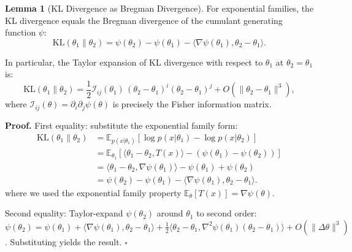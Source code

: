 \documentclass[12pt,a4paper]{article}
\theoremstyle{definition}
\newtheorem{lemma}{Lemma}[section]
\theoremstyle{remark}
\theoremstyle{definition}
\newcommand{\E}{\mathbb{E}}
\newcommand{\Fisher}{\mathcal{I}}
\newcommand{\KL}{\mathrm{KL}}
\begin{document}
\begin{lemma}[KL Divergence as Bregman Divergence]\label{lem:kl_bregman}
For exponential families, the KL divergence equals the Bregman divergence of the cumulant generating function $\psi$:
\[
    \KL(\theta_1 \| \theta_2) = \psi(\theta_2) - \psi(\theta_1) - \langle \nabla \psi(\theta_1), \theta_2 - \theta_1 \rangle.
\]

In particular, the Taylor expansion of KL divergence with respect to $\theta_1$ at $\theta_2 = \theta_1$ is:
\[
    \KL(\theta_1 \| \theta_2) = \frac{1}{2} \Fisher_{ij}(\theta_1) \, (\theta_2 - \theta_1)^i (\theta_2 - \theta_1)^j + O(\|\theta_2 - \theta_1\|^3),
\]
where $\Fisher_{ij}(\theta) = \partial_i \partial_j \psi(\theta)$ is precisely the Fisher information matrix.

\textbf{Proof.}
First equality: substitute the exponential family form:
\begin{align*}
    \KL(\theta_1 \| \theta_2) &= \E_{p(x|\theta_1)}[\log p(x|\theta_1) - \log p(x|\theta_2)] \\
    &= \E_{\theta_1}[\langle \theta_1 - \theta_2, T(x) \rangle - (\psi(\theta_1) - \psi(\theta_2))] \\
    &= \langle \theta_1 - \theta_2, \nabla \psi(\theta_1) \rangle - \psi(\theta_1) + \psi(\theta_2) \\
    &= \psi(\theta_2) - \psi(\theta_1) - \langle \nabla \psi(\theta_1), \theta_2 - \theta_1 \rangle.
\end{align*}
where we used the exponential family property $\E_{\theta}[T(x)] = \nabla \psi(\theta)$.

Second equality: Taylor-expand $\psi(\theta_2)$ around $\theta_1$ to second order:
$\psi(\theta_2) = \psi(\theta_1) + \langle \nabla\psi(\theta_1), \theta_2 - \theta_1 \rangle
+ \frac{1}{2}\langle \theta_2 - \theta_1, \nabla^2\psi(\theta_1)(\theta_2 - \theta_1) \rangle + O(\|\Delta\theta\|^3)$.
Substituting yields the result. $\square$
\end{lemma}
\end{document}
